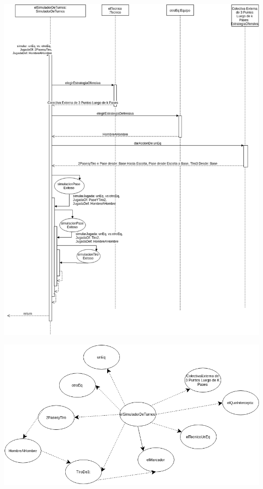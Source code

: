 \includegraphics[width=\textwidth]{imgs/colectivaExternaDe3Secuencia.png}

\includegraphics[width=\textwidth]{imgs/colectivaExternaDe3Objetos.png}


